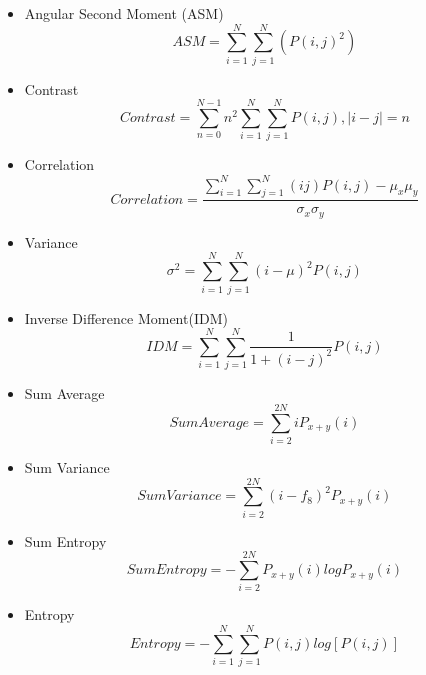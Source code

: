 \documentclass[review]{elsarticle}
\begin{document}
\begin{itemize}
	\item Angular Second Moment (ASM)
	\begin{equation}
	ASM = \sum_{i=1}^N\sum_{j=1}^N (P(i,j)^2)
	\end{equation}	
	
	\item Contrast
	\begin{equation}
	Contrast = \sum_{n=0}^{N -1}n^2{\sum_{i=1}^{N}\sum_{j=1}^{N} P(i,j)}, |i - j| =n
	\end{equation}
	
	
	\item Correlation \\ 
	\begin{equation}
	Correlation = \dfrac{\sum_{i=1}^N\sum_{j=1}^N (ij)P(i,j)-\mu_x \mu_y}{\sigma_x \sigma_y} 
	\end{equation}
	
	\item Variance  
	\begin{equation}
	\sigma^2= \sum_{i=1}^N\sum_{j=1}^N (i - \mu)^2P(i,j)
	\end{equation}
	
	\item Inverse Difference Moment(IDM) 
	\begin{equation}
	IDM=\sum_{i=1}^N\sum_{j=1}^N \dfrac{1}{1+(i-j)^2} P(i,j)
	\end{equation}
	
	
	\item Sum Average 
	\begin{equation}
	Sum Average= \sum_{i=2}^{2N} iP_{x+y}(i) 
	\end{equation}
	
	\item Sum Variance 
	\begin{equation}
	Sum Variance = \sum_{i=2}^{2N} (i-f_8)^2P_{x+y}(i) 
	\end{equation}
	
	\item Sum Entropy 
	\begin{equation}
	Sum Entropy= - \sum_{i=2}^{2N} P_{x+y}(i) log{P_{x+y}(i)}
	\end{equation}
	
	\item Entropy 
	\begin{equation}
	Entropy= - \sum_{i=1}^N\sum_{j=1}^N P(i,j) log[P(i,j)]
	\end{equation}
	

\end{itemize}
\end{document}

